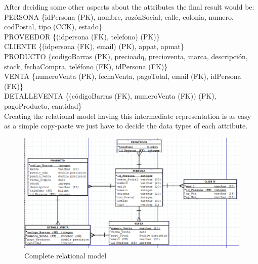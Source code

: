 \documentclass{article}
\begin{document}
After deciding some other aspects about the attributes the final result would be:\\

PERSONA \{id\textunderscore Persona (PK), nombre, razón\textunderscore Social, calle, colonia, numero, cod\textunderscore Postal, tipo (CCK), estado\}\\

PROVEEDOR \{(id\textunderscore persona (FK), telefono) (PK)\}\\

CLIENTE \{(id\textunderscore persona (FK), email) (PK), ap\textunderscore pat, ap\textunderscore mat\}\\

PRODUCTO \{codigo\textunderscore Barras (PK), precio\textunderscore adq, precio\textunderscore venta, marca, descripción, stock, fecha\textunderscore Compra, teléfono (FK), id\textunderscore Persona (FK)\}\\

VENTA \{numero\textunderscore Venta (PK), fecha\textunderscore Venta, pago\textunderscore Total, email (FK), id\textunderscore Persona (FK)\}\\

DETALLE\textunderscore VENTA \{(código\textunderscore Barras (FK), numero\textunderscore Venta (FK)) (PK), pago\textunderscore Producto, cantidad\}\\

Creating the relational model having this intermediate representation is as easy as a simple copy-paste we just have to decide the data types of each attribute.\\

\begin{figure}[h]
\caption {Complete relational model}
\centering
\includegraphics[width=\textwidth]{fig2}
\end{figure}
\end{document}
